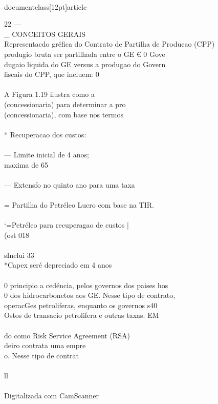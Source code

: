 \\documentclass[12pt]{article}
\begin{document}
22 —\\_ CONCEITOS GERAIS\\
Representacdo gréfica do Contrato de Partilha de Produ¢ao (CPP)\\
produgio bruta ser partilhada entre o GE € 0 Gove\\
dugaio liquida do GE versus a produgao do Govern\\
fiscais do CPP, que incluem: 0\\
\\
A Figura 1.19 ilustra como a\\
(concessionaria) para determinar a pro\\
(concessionaria), com base nos termos\\
\\
* Recuperacao dos custos:\\
\\
— Limite inicial de 4 anos;\\
maxima de 65\\%
\\
— Extensfo no quinto ano para uma taxa\\
\\
= Partilha do Petréleo Lucro com base na TIR.\\
\\
‘=Petréleo para recuperagao de custos |\\
(ost 018\\
\\
sInelui 33\\%
*Capex seré depreciado em 4 anos\\
\\
0 principio a cedéncia, pelos governos dos paises hos\\
0 dos hidrocarbonetos aos GE. Nesse tipo de contrato,\\
operacGes petroliferas, enquanto os governos s40\\
Ostos de transacio petrolifera e outras taxas. EM\\
\\
do como Risk Service Agreement (RSA)\\
deiro contrata uma empre\\
o. Nesse tipo de contrat\\
\\
ll\\
\\
Digitalizada com CamScanner\\
\end{document}

